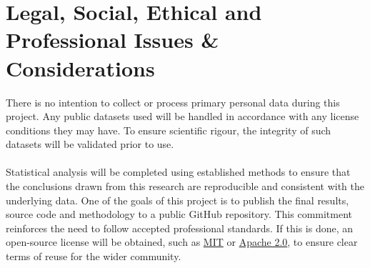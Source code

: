 
\section{Legal, Social, Ethical and Professional Issues \& Considerations}
\label{sec:IssuesAndConsiderations}

\large{\raggedright
There is no intention to collect or process primary personal data during this project. Any public datasets used will be handled in accordance with any license conditions they may have. To ensure scientific rigour, the integrity of such datasets will be validated prior to use. \\
~\\
Statistical analysis will be completed using established methods \cite{RodriguezGrasa26} to ensure that the conclusions drawn from this research are reproducible and consistent with the underlying data. One of the goals of this project is to publish the final results, source code and methodology to a public GitHub repository. This commitment reinforces the need to follow accepted professional standards. If this is done, an open-source license will be obtained, such as \href{https://opensource.org/license/mit}{\color{blue}MIT} or \href{https://www.apache.org/licenses/LICENSE-2.0}{\color{blue} Apache 2.0}, to ensure clear terms of reuse for the wider community.
\par
}
